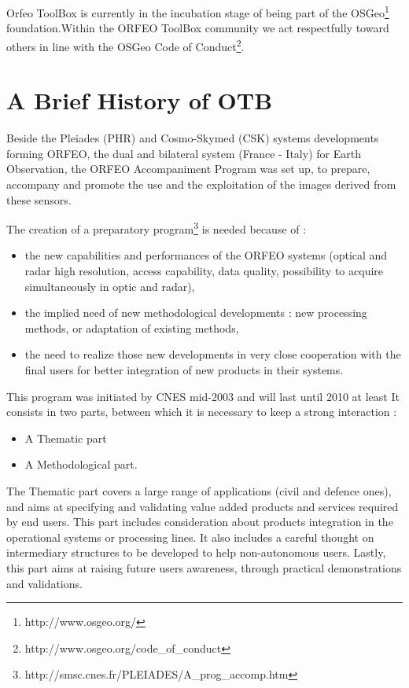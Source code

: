 Orfeo ToolBox is currently in the incubation stage of being part of the
OSGeo\footnote{http://www.osgeo.org/} foundation.Within the ORFEO ToolBox
community we act respectfully toward others in line with the OSGeo Code of
Conduct\footnote{http://www.osgeo.org/code\_of\_conduct}.


\section{A Brief History of OTB}
\label{sec:History}



Beside the Pleiades (PHR) and Cosmo-Skymed (CSK) systems developments forming
ORFEO, the dual and bilateral system (France - Italy) for Earth Observation, the
ORFEO Accompaniment Program was set up, to prepare, accompany and promote the
use and the exploitation of the images derived from these sensors.

The creation of a preparatory
program\footnote{http://smsc.cnes.fr/PLEIADES/A\_prog\_accomp.htm} is needed
because of :
\begin{itemize}
\item the new capabilities and performances of the ORFEO systems (optical and
radar high resolution, access capability, data quality, possibility to acquire
simultaneously in optic and radar),
\item the implied need of new methodological developments : new processing
methods, or adaptation of existing methods,
\item the need to realize those new developments in very close
  cooperation with the final users for better integration of new products in
their systems.

\end{itemize}

This program was initiated by CNES mid-2003 and will last until 2010 at least
It consists in two parts, between which it is necessary to keep a strong
interaction :
\begin{itemize}
\item A Thematic part
\item A Methodological part.
\end{itemize}

The Thematic part covers a large range of applications (civil and
defence ones), and aims at specifying and validating value added
products and services required by end users. This part includes
consideration about products integration in the operational systems or
processing lines. It also includes a careful thought on intermediary
structures to be developed to help non-autonomous users. Lastly, this part aims
at raising future users awareness, through practical demonstrations and
validations.

